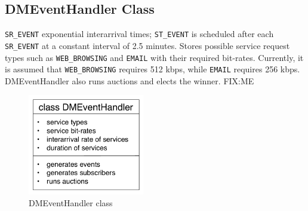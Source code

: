 \subsection{DMEventHandler Class}
\label{sub:dmeventhandler_class_dmappendix}
\lstinline{SR_EVENT} exponential interarrival times; \lstinline{ST_EVENT} is scheduled after each \lstinline{SR_EVENT} at a constant interval of 2.5 minutes. Stores possible service request types such as \lstinline{WEB_BROWSING} and \lstinline{EMAIL} with their required bit-rates. Currently, it is assumed that \lstinline{WEB_BROWSING} requires 512 kbps, while \lstinline{EMAIL} requires 256 kbps. DMEventHandler also runs auctions and elects the winner. FIX:ME \cite{DMKonkaIaria12}

\begin{figure}[t]
	\includegraphics[width=2in]{Appendices/Figures/dmeventhandler_class}
	\caption{DMEventHandler class}
	\label{fig:dmeventhandler_class_dmappendix}
\end{figure}

